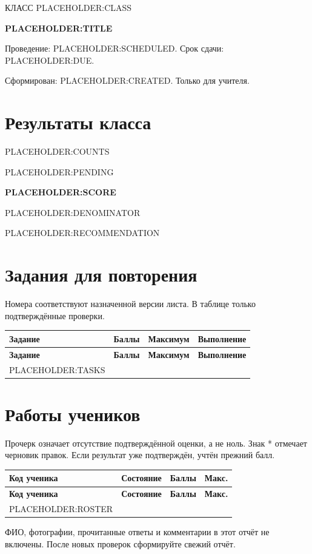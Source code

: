 \documentclass[a4paper,11pt]{article}
\begin{document}
{\small\color{quiet}КЛАСС PLACEHOLDER:CLASS}\par\vspace{3mm}
{\LARGE\bfseries PLACEHOLDER:TITLE}\par\vspace{3mm}
Проведение: PLACEHOLDER:SCHEDULED. Срок сдачи: PLACEHOLDER:DUE.\par
{\small\color{quiet}Сформирован: PLACEHOLDER:CREATED. Только для учителя.}\par
\section*{Результаты класса}
PLACEHOLDER:COUNTS\par\smallskip
PLACEHOLDER:PENDING\par\medskip
{\bfseries PLACEHOLDER:SCORE}\par\smallskip
{\small PLACEHOLDER:DENOMINATOR}\par\medskip
PLACEHOLDER:RECOMMENDATION\par
\section*{Задания для повторения}
{\small Номера соответствуют назначенной версии листа. В таблице только подтверждённые проверки.}\par
\begin{longtable}{@{}p{32mm}r r r@{}}
\hline
\textbf{Задание} & \textbf{Баллы} & \textbf{Максимум} & \textbf{Выполнение} \\
\hline\endfirsthead
\hline
\textbf{Задание} & \textbf{Баллы} & \textbf{Максимум} & \textbf{Выполнение} \\
\hline\endhead
\hline\endfoot
PLACEHOLDER:TASKS
\end{longtable}
\section*{Работы учеников}
{\small Прочерк означает отсутствие подтверждённой оценки, а не ноль. Знак * отмечает черновик правок. Если результат уже подтверждён, учтён прежний балл.}\par
\begin{longtable}{@{}p{39mm}p{72mm}r r@{}}
\hline
\textbf{Код ученика} & \textbf{Состояние} & \textbf{Баллы} & \textbf{Макс.} \\
\hline\endfirsthead
\hline
\textbf{Код ученика} & \textbf{Состояние} & \textbf{Баллы} & \textbf{Макс.} \\
\hline\endhead
\hline\endfoot
PLACEHOLDER:ROSTER
\end{longtable}
{\small\color{quiet}ФИО, фотографии, прочитанные ответы и комментарии в этот отчёт не включены. После новых проверок сформируйте свежий отчёт.}
\end{document}
